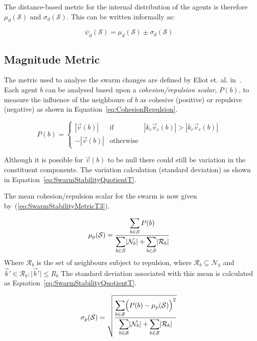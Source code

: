 \documentclass{ieeeaccess}
\newcommand{\magn}[1]{\vert{#1}\vert}
\begin{document}
The distance-based metric for the internal distribution of the agents is therefore $\mu_d(\mathcal S)$ and $\sigma_d(\mathcal S)$. This can be written informally as:

\begin{equation}
\label{eq:SwarmDistanceMetric}
\psi_d(\mathcal S) = \mu_d(\mathcal S)\pm \sigma_d(\mathcal S)
\end{equation}

\subsection{Magnitude Metric}

The metric used to analyse the swarm changes are defined by Eliot et. al. in~\cite{EKB:18}. Each agent $b$ can be analysed based upon a \textit{cohesion/repulsion scalar}, $P(b)$, to measure the influence of the neighbours of $b$ as cohesive (positive) or repulsive (negative) as shown in Equation~\ref{eq:CohesionRepulsion}.

\begin{equation}
\label{eq:CohesionRepulsion}
P(b) = \left\{\begin{array}{lll}
               |\vec v(b)|& \mathrm{if} & |k_c \vec v_c(b)| > |k_r \vec v_r(b)|\\
              -|\vec v(b)|& \mathrm{otherwise}
              \end{array}\right.
\end{equation}

Although it is possible for $\vec v(b)$ to be null there could still be variation in the constituent components. The variation calculation (standard deviation) as shown in Equation~\ref{eq:SwarmStabilityQuotientT}. 

The mean cohesion/repulsion scalar for the swarm is now given by~(\ref{eq:SwarmStabilityMetricT3}).  

\begin{equation}
\label{eq:SwarmStabilityMetricT3}
\mu_p(\mathcal S) = \frac{\mathlarger{\sum_{b \in \mathcal S} P(b)}}{\mathlarger{\sum_{b \in \mathcal S}}|\mathcal{N}_b| + \mathlarger{\sum_{b \in \mathcal S}}|\mathcal R_b|}
\end{equation}
Where $\mathcal R_b$ is the set of neighbours subject to repulsion, 
where $\mathcal R_b \subseteq \mathcal N_b$ and $\vec b'\in\mathcal R_b:\magn{\vec b'}\leq R_b$
The standard deviation associated with this mean is calculated as Equation~\ref{eq:SwarmStabilityQuotientT}.

\begin{equation}
\label{eq:SwarmStabilityQuotientT}
\sigma_p(\mathcal S) = \sqrt{\frac{\mathlarger{\sum_{b \in \mathcal S}}\Big(P(b)-\mu_p(\mathcal S)\Big)^2}{\mathlarger{\sum_{b \in \mathcal S}}|\mathcal{N}_b| + \mathlarger{\sum_{b \in \mathcal S}}|\mathcal R_b|}}
\end{equation}
\end{document}
